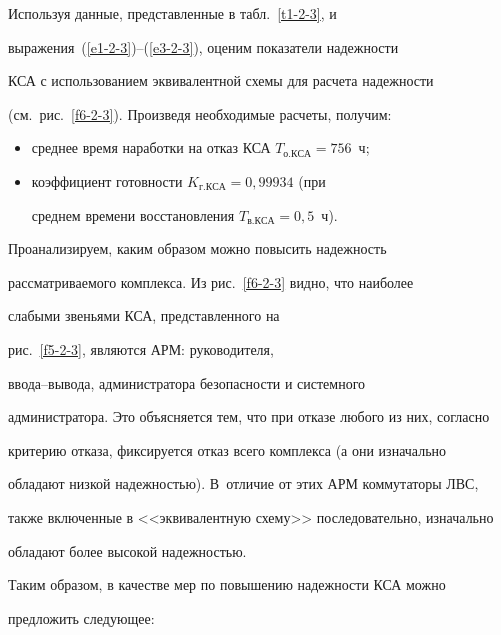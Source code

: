      Используя данные, представленные в табл.~\ref{t1-2-3}, и 


     выражения~(\ref{e1-2-3})--(\ref{e3-2-3}), оценим показатели надежности 


КСА с использованием эквивалентной схемы для расчета надежности 


(см.\ рис.~\ref{f6-2-3}). Произведя необходимые расчеты, получим:


     \begin{itemize}


     \item  среднее время наработки на отказ КСА $T_{\mathrm{о.КСА}} = 


756$~ч;


     \item коэффициент готовности $K_{\mathrm{г.КСА}} = 0{,}99934$ (при 


среднем времени вос\-ста\-нов\-ле\-ния $T_{\mathrm{в.КСА}} = 0{,}5$~ч).


     \end{itemize}


     


     Проанализируем, каким образом можно повысить надежность 


рассматриваемого комплекса. Из рис.~\ref{f6-2-3} видно, что наиболее 


слабыми звеньями КСА,  представленного на 


рис.~\ref{f5-2-3}, являются АРМ: руководителя, 


вво\-да--вы\-во\-да, администратора безопасности и системного 


администратора. Это объясняется тем, что при отказе любого из них, согласно 


критерию отказа, фиксируется отказ всего комплекса (а они изначально 


обладают низкой надежностью). В~отличие от этих АРМ коммутаторы ЛВС, 


также включенные в <<эквивалентную схему>> последовательно, изначально 


обладают более высокой надежностью. 


     


     Таким образом, в качестве мер по повышению надежности КСА можно 


предложить следующее:


